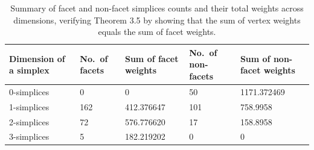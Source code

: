 \documentclass[12pt]{article}
\theoremstyle{normalhead_nobrackets}
\theoremstyle{exampstyle}
\begin{document}
\begin{table}[h!]
\centering
\setlength{\tabcolsep}{6pt}
\renewcommand{\arraystretch}{1.2}

\begin{tabular}{|p{2.5cm}|p{2cm}|p{2.7cm}|p{2.4cm}|p{2.8cm}|}
\hline
\textbf{Dimension  of a simplex} 
& \textbf{No.\ of facets} 
& \textbf{Sum of facet weights} 
& \textbf{No.\ of non-facets} 
& \textbf{Sum of non-facet weights} \\
\hline
0-simplices & 0   & 0            & 50  & 1171.372469 \\
\hline
1-simplices & 162 & 412.376647   & 101 & 758.9958 \\
\hline
2-simplices & 72  & 576.776620   & 17  & 158.8958 \\
\hline
3-simplices & 5   & 182.219202   & 0   & 0 \\
\hline
\end{tabular}
\caption{\footnotesize Summary of facet and non-facet simplices counts and their total weights across dimensions, verifying Theorem 3.5 by showing that the sum of vertex weights equals the sum of facet weights.}
\end{table}
\end{document}
